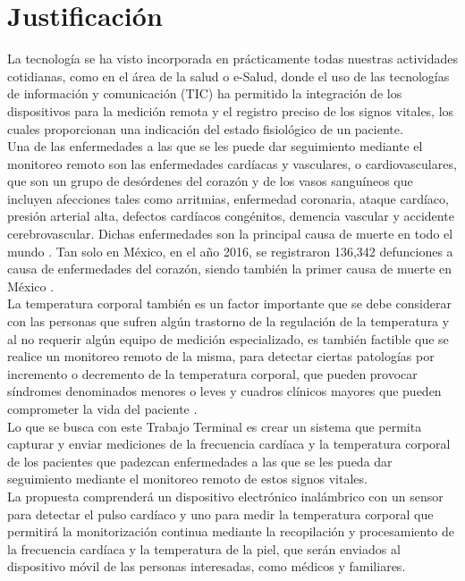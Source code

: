 \section{Justificación}
La tecnología se ha visto incorporada en prácticamente todas nuestras actividades cotidianas, como en el área de la salud o e-Salud, donde el uso de las tecnologías de información y comunicación (TIC) ha permitido la integración de los dispositivos para la medición remota y el registro preciso de los signos vitales, los cuales proporcionan una indicación del estado fisiológico de un paciente.\\

Una de las enfermedades a las que se les puede dar seguimiento mediante el monitoreo remoto son las enfermedades cardíacas y vasculares, o cardiovasculares, que son un grupo de desórdenes del corazón y de los vasos sanguíneos que incluyen afecciones tales como arritmias, enfermedad coronaria, ataque cardíaco, presión arterial alta, defectos cardíacos congénitos, demencia vascular y accidente cerebrovascular. Dichas enfermedades son la principal causa de muerte en todo el mundo \cite{who2017}.  Tan solo en México, en el año 2016, se registraron 136,342 defunciones a causa de enfermedades del corazón, siendo también la primer causa de muerte en México \cite{inegiMortalidad}.\\

La temperatura corporal también es un factor importante que se debe considerar con las personas que sufren algún trastorno de la regulación de la temperatura y al no requerir algún equipo de medición especializado, es también factible que se realice un monitoreo remoto de la misma, para detectar ciertas patologías por incremento o decremento de la temperatura corporal, que pueden provocar síndromes denominados menores o leves y cuadros clínicos mayores que pueden comprometer la vida del paciente \cite{lizarralde2000}.\\

Lo que se busca con este Trabajo Terminal es crear un sistema que permita capturar y enviar mediciones de la frecuencia cardíaca y la temperatura corporal de los pacientes que padezcan enfermedades a las que se les pueda dar seguimiento mediante el monitoreo remoto de estos signos vitales.\\

La propuesta comprenderá un dispositivo electrónico inalámbrico con un sensor para detectar el pulso cardíaco y uno para medir la temperatura corporal que permitirá la monitorización continua mediante la recopilación y procesamiento de la frecuencia cardíaca y la temperatura de la piel, que serán enviados al dispositivo móvil de las personas interesadas, como médicos y familiares.

